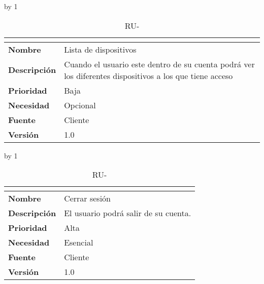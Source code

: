 \advance\ru by 1
\begin{table}[H]
	\caption{RU-\number\ru}
	\begin{tabular}{|l|p{}|}
		\hline
		\multicolumn{2}{|c|}{\cellcolor[HTML]{BFBFBF}{\color[HTML]{000000} \textbf{RU-\number\ru}}} \\ \hline
		\textbf{Nombre}      & Lista de dispositivos                                                                                   \\ \hline
		\textbf{Descripción} & Cuando el usuario este dentro de su cuenta podrá ver los diferentes dispositivos a los que tiene acceso \\ \hline
		\textbf{Prioridad}   & Baja                                                                                                    \\ \hline
		\textbf{Necesidad}   & Opcional                                                                                                \\ \hline
		\textbf{Fuente}      & Cliente                                                                                                 \\ \hline
		\textbf{Versión}     & 1.0                                                                                                     \\ \hline
	\end{tabular}
\end{table}
\advance\ru by 1
\begin{table}[H]
	\caption{RU-\number\ru}
	\begin{tabular}{|l|p{}|}
		\hline
		\multicolumn{2}{|c|}{\cellcolor[HTML]{BFBFBF}{\color[HTML]{000000} \textbf{RU-\number\ru}}} \\ \hline
		\textbf{Nombre}      & Cerrar sesión                        \\ \hline
		\textbf{Descripción} & El usuario podrá salir de su cuenta. \\ \hline
		\textbf{Prioridad}   & Alta                                 \\ \hline
		\textbf{Necesidad}   & Esencial                             \\ \hline
		\textbf{Fuente}      & Cliente                              \\ \hline
		\textbf{Versión}     & 1.0                                  \\ \hline
	\end{tabular}
\end{table}
